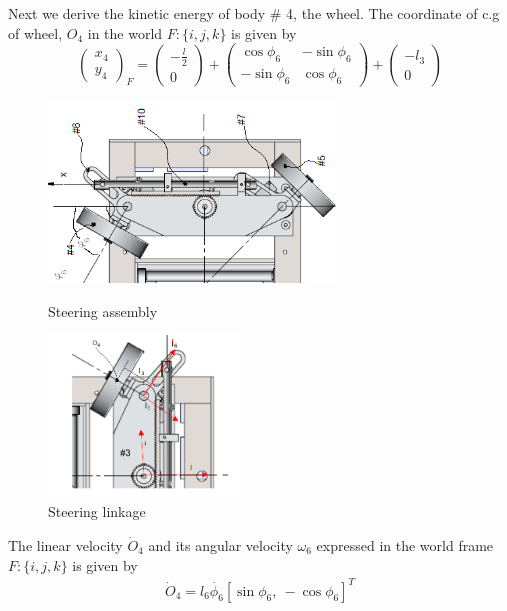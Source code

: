  
 Next we derive the kinetic energy of body \# 4, the wheel. 
 The coordinate of c.g of wheel, $O_4$ in the world  $F:\{i,j,k\}$  is given by \[ \begin{pmatrix}
x_{4}\\y_{4} \end{pmatrix}_F
= \begin{pmatrix}-\frac{l}{2} \\0
\end{pmatrix}+
\begin{pmatrix}
		\cos\phi_6 &  -\sin\phi_6\\ -\sin\phi_6 & \cos\phi_6
\end{pmatrix} + 
\begin{pmatrix}
			-l_3\\0
\end{pmatrix}\]
\begin{figure}
	\begin{minipage}[t]{0.5\textwidth}
		\centering
		\includegraphics[width=3in]{Chapter4/fig/SteerModel} 
		\caption{Steering assembly}\label{fig:SteerAsm}
	\end{minipage}
	\hfill
	\begin{minipage}[t]{0.5\textwidth}
		\centering
		\includegraphics[width=2in]{Chapter4/fig/link} 
		\caption{Steering linkage }\label{fig:SteerLink}
	\end{minipage}
\end{figure}
 	
  The linear velocity $\dot{O}_4$  and its angular velocity $\omega_6$  expressed in the world frame $F:\{i,j,k\}$ is given by
 \begin{eqnarray}
 \dot{O}_4=l_6\dot{\phi_6}[\sin\phi_6, ~ -\cos\phi_6] ^T
 \end{eqnarray}
 
